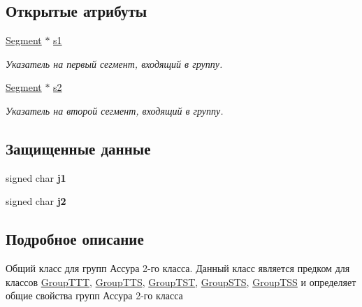 \subsection*{Открытые атрибуты}
\begin{DoxyCompactItemize}
\item 
\hypertarget{class_group2_a030b303d13894d1b4cc3fff13d0730e3}{
\hyperlink{class_segment}{Segment} $\ast$ \hyperlink{class_group2_a030b303d13894d1b4cc3fff13d0730e3}{s1}}
\label{class_group2_a030b303d13894d1b4cc3fff13d0730e3}

\begin{DoxyCompactList}\small\item\em Указатель на первый сегмент, входящий в группу. \item\end{DoxyCompactList}\item 
\hypertarget{class_group2_aa48298daf05b4db8436dedf8d7b151ef}{
\hyperlink{class_segment}{Segment} $\ast$ \hyperlink{class_group2_aa48298daf05b4db8436dedf8d7b151ef}{s2}}
\label{class_group2_aa48298daf05b4db8436dedf8d7b151ef}

\begin{DoxyCompactList}\small\item\em Указатель на второй сегмент, входящий в группу. \item\end{DoxyCompactList}\end{DoxyCompactItemize}
\subsection*{Защищенные данные}
\begin{DoxyCompactItemize}
\item 
\hypertarget{class_group2_a7db550e982367127cc348a8872d3c1b8}{
signed char {\bfseries j1}}
\label{class_group2_a7db550e982367127cc348a8872d3c1b8}

\item 
\hypertarget{class_group2_af93d7542e023c1d24098526daf65131e}{
signed char {\bfseries j2}}
\label{class_group2_af93d7542e023c1d24098526daf65131e}

\end{DoxyCompactItemize}


\subsection{Подробное описание}
Общий класс для групп Ассура 2-\/го класса. Данный класс является предком для классов \hyperlink{class_group_t_t_t}{GroupTTT}, \hyperlink{class_group_t_t_s}{GroupTTS}, \hyperlink{class_group_t_s_t}{GroupTST}, \hyperlink{class_group_s_t_s}{GroupSTS}, \hyperlink{class_group_t_s_s}{GroupTSS} и определяет общие свойства групп Ассура 2-\/го класса 

